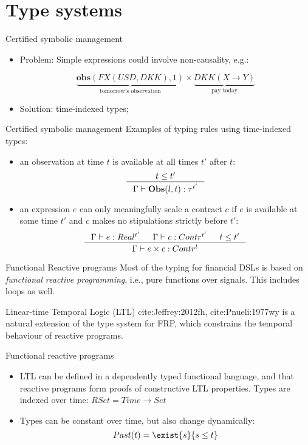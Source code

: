 \documentclass[aspectratio=169]{beamer}
\newcommand{\describe}[2]{\underbrace{#1}_{\text{#2}}}
\begin{document}
\section{Type systems}
\label{sec:org7981c07}
\begin{frame}[label={sec:org7c660c9}]{Certified symbolic management}
\begin{itemize}
\item \alert{Problem}: Simple expressions could involve non-causality, e.g.:

$$\describe{\textbf{obs}(FX(USD, DKK), 1)}{tomorrow's observation} \times \describe{DKK(X \rightarrow Y)}{pay today}$$

\item \alert{Solution}: time-indexed types;
\end{itemize}
\end{frame}

\begin{frame}[label={sec:org6a9b68d}]{Certified symbolic management}
\alert{Examples} of typing rules using time-indexed types:

\begin{itemize}
\item an observation at time \(t\) is available at all times \(t'\) after \(t\):
$$\inference{t \leq t'}{\Gamma |- \textbf{Obs}(l,t) : \tau^{t'}}$$

\item an expression \(e\) can only meaningfully scale a contract \(c\) if \(e\) is
available at some time \(t'\) and \(c\) makes no stipulations strictly before
\(t'\): $$\inference{\Gamma |- e: Real^{t'} & \Gamma |- c: Contr^{t'} & t \leq t'}{\Gamma |- e \times c:
  Contr^t}$$
\end{itemize}
\end{frame}

\begin{frame}[label={sec:org8f07a16}]{Functional Reactive programs}
Most of the typing for financial DSLs is based on \emph{functional reactive programming}, i.e.,
pure functions over signals. This includes loops as well.

Linear-time Temporal Logic (LTL) cite:Jeffrey:2012fh, cite:Pnueli:1977wy is a
natural extension of the type system for FRP, which constrains the temporal
behaviour of reactive programs.
\end{frame}

\begin{frame}[label={sec:org6c47ddc}]{Functional reactive programs}
\begin{itemize}
\item LTL can be defined in a dependently typed functional language, and that
reactive programs form proofs of constructive LTL properties.
Types are indexed over time: \(RSet = Time \rightarrow Set\)

\item Types can be constant over time, but also change dynamically:
$$Past(t) = \exist{s}{s \leq t}$$
\end{itemize}
\end{frame}
\end{document}
